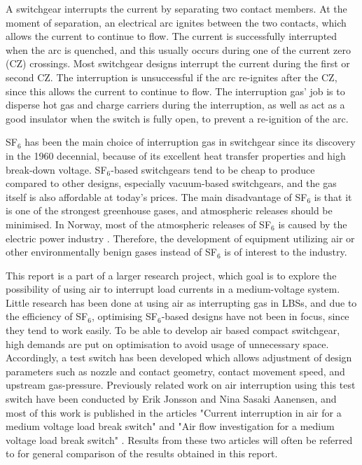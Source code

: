 \documentclass[10pt,b5paper,twoside]{article}
\begin{document}
A switchgear interrupts the current by separating two contact members. At the moment of separation, an electrical arc ignites between the two contacts, which allows the current to continue to flow. The current is successfully interrupted when the arc is quenched, and this usually occurs during one of the current zero (CZ) crossings. Most switchgear designs interrupt the current during the first or second CZ. The interruption is unsuccessful if the arc re-ignites after the CZ, since this allows the current to continue to flow. The interruption gas' job is to disperse hot gas and charge carriers during the interruption, as well as act as a good insulator when the switch is fully open, to prevent a re-ignition of the arc. %

SF$_6$ has been the main choice of interruption gas in switchgear since its discovery in the 1960 decennial, because of its excellent heat transfer properties and high break-down voltage. SF$_6$-based switchgears tend to be cheap to produce compared to other designs, especially vacuum-based switchgears, and the gas itself is also affordable at today's prices. The main disadvantage of SF$_6$ is that it is one of the strongest greenhouse gases, and atmospheric releases should be minimised. In Norway, most of the atmospheric releases of SF$_6$ is caused by the electric power industry \cite{bib:StatSF6}. Therefore, the development of equipment utilizing air or other environmentally benign gases instead of SF$_6$ is of interest to the industry.

This report is a part of a larger research project, which goal is to explore the possibility of using air to interrupt load currents in a medium-voltage system. Little research has been done at using air as interrupting gas in LBSs, and due to the efficiency of SF$_6$, optimising SF$_6$-based designs have not been in focus, since they tend to work easily. To be able to develop air based compact switchgear, high demands are put on optimisation to avoid usage of unnecessary space. Accordingly, a test switch has been developed which allows adjustment of design parameters such as nozzle and contact geometry, contact movement speed, and upstream gas-pressure. Previously related work on air interruption using this test switch have been conducted by Erik Jonsson and Nina Sasaki Aanensen, and most of this work is published in the articles "Current interruption in air for a medium voltage load break switch" \cite{bib:CIAMVLBS} and "Air flow investigation for a medium voltage load break switch" \cite{bib:AFIMVLBA}. Results from these two articles will often be referred to for general comparison of the results obtained in this report.
\end{document}
